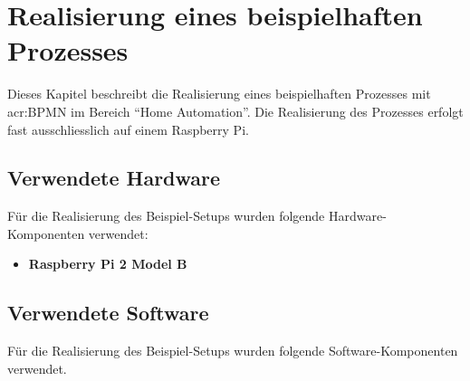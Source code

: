 
\chapter{Realisierung eines beispielhaften Prozesses}\label{sec:AnalyseRPI:Beispiel}
Dieses Kapitel beschreibt die Realisierung eines beispielhaften Prozesses mit \gls{acr:BPMN} im Bereich "`Home Automation"'. Die Realisierung des Prozesses erfolgt fast ausschliesslich  auf einem Raspberry Pi.

\section{Verwendete Hardware}
Für die Realisierung des Beispiel-Setups wurden folgende Hardware-Komponenten verwendet:
\begin{itemize}
\item \textbf{Raspberry Pi 2 Model B}
\end{itemize}

\section{Verwendete Software} \label{sec:AnalyseRPI:Beispiel:SW}
Für die Realisierung des Beispiel-Setups wurden folgende Software-Komponenten verwendet.

